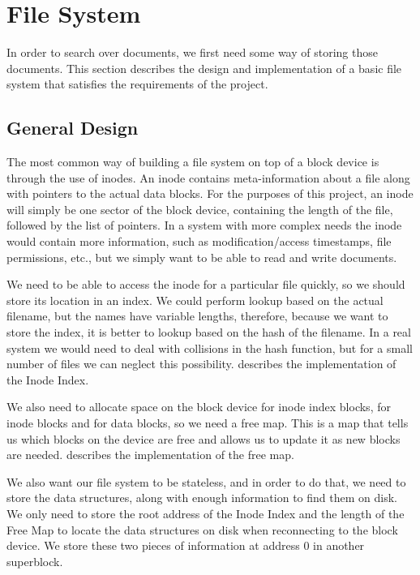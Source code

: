 \documentclass[12pt,a4paper,twoside,openright]{report}
\begin{document}
\section{File System}
\label{sec:fileSystem}

In order to search over documents, we first need some way of storing those documents. This section describes the design and implementation of a basic file system that satisfies the requirements of the project.

\subsection{General Design}

The most common way of building a file system on top of a block device is through the use of inodes. An inode contains meta-information about a file along with pointers to the actual data blocks. For the purposes of this project, an inode will simply be one sector of the block device, containing the length of the file, followed by the list of pointers. In a system with more complex needs the inode would contain more information, such as modification/access timestamps, file permissions, etc., but we simply want to be able to read and write documents.

We need to be able to access the inode for a particular file quickly, so we should store its location in an index. We could perform lookup based on the actual filename, but the names have variable lengths, therefore, because we want to store the index, it is better to lookup based on the hash of the filename. In a real system we would need to deal with collisions in the hash function, but for a small number of files we can neglect this possibility.  describes the implementation of the Inode Index.

We also need to allocate space on the block device for inode index blocks, for inode blocks and for data blocks, so we need a free map. This is a map that tells us which blocks on the device are free and allows us to update it as new blocks are needed.  describes the implementation of the free map.

We also want our file system to be stateless, and in order to do that, we need to store the data structures, along with enough information to find them on disk. We only need to store the root address of the Inode Index and the length of the Free Map to locate the data structures on disk when reconnecting to the block device. We store these two pieces of information at address 0 in another superblock.
\end{document}
